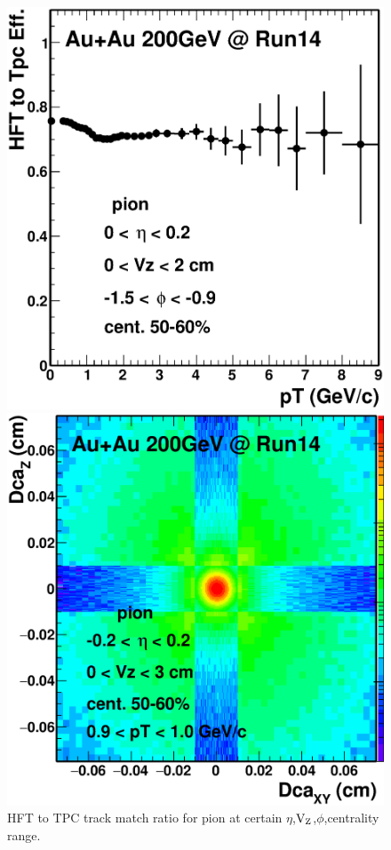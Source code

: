 \begin{figure}[htbp]
\begin{minipage}[htbp]{0.52\linewidth}
\centering
\includegraphics[width=1.0\textwidth,angle=0]{figure/Run14_D0HFT/hftRatioExample.eps}
\caption{ HFT to TPC track match ratio for pion at certain $\eta$,$\textup{V}_{\textup{Z}}$,$\phi$,centrality range. \label{hftRatioExample}}
\end{minipage}
\hfill
\begin{minipage}[htbp]{0.52\linewidth}
\centering
\includegraphics[width=1.0\textwidth,angle=0]{figure/Run14_D0HFT/DcaExample.eps} 

\end{minipage}
\end{figure}
